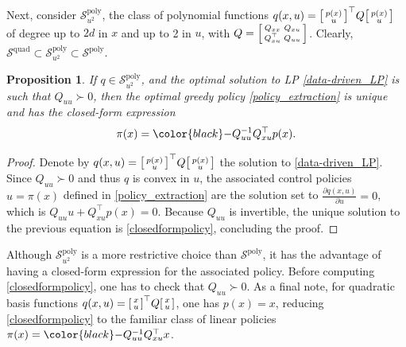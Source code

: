 \documentclass[journal,twoside,web]{ieeecolor}
\newtheorem{prop}{Proposition}
\newcommand{\Sc}{\mathcal{S}}
\newcommand{\review}{\color{black}}
\begin{document}
Next, consider $\Sc^{\text{poly}}_{u^2}$, the class of polynomial functions $q(x,u)=\begin{bsmallmatrix}
    p(x) \\ u 
\end{bsmallmatrix}^\top Q \begin{bsmallmatrix}
    p(x) \\ u 
\end{bsmallmatrix}$ of degree up to $2d$ in $x$ and up to 2 in $u$, with
$Q = \begin{bsmallmatrix} Q_{xx} & Q_{xu} \\ Q_{xu}^\top  & Q_{uu}
\end{bsmallmatrix}$. 
Clearly,  $\Sc^{\text{quad}}\subset\Sc^{\text{poly}}_{u^2}\subset\Sc^{\text{poly}}$.
%
\begin{prop}
    If $q\in\Sc^{\text{poly}}_{u^2}$, and the optimal solution to LP \eqref{data-driven_LP} is such that $Q_{uu}\succ0$, then the optimal greedy policy \eqref{policy_extraction} is unique and has the closed-form expression
    \begin{equation} \label{closedformpolicy}
        \pi(x)={\review -}Q_{uu}^{-1}Q_{xu}^\top p(x).
    \end{equation}
\end{prop}
\vspace{0.15cm}
\begin{proof}
 Denote by $q(x,u)=\begin{bsmallmatrix}
    p(x) \\ u 
\end{bsmallmatrix}^\top Q \begin{bsmallmatrix}
    p(x) \\ u 
\end{bsmallmatrix}$ the solution to \eqref{data-driven_LP}. 
Since $Q_{uu}\succ0$ and thus $q$ is convex in $u$, the associated control policies $u=\pi(x)$ defined in \eqref{policy_extraction} are the solution set to $\tfrac{\partial q(x,u)}{\partial u}=0$, which is $Q_{uu}u + Q_{xu}^\top p(x)=0$. Because $Q_{uu}$ is invertible, the unique solution to the previous equation is \eqref{closedformpolicy}, concluding the proof.
\end{proof}

Although $\Sc^{\text{poly}}_{u^2}$ is a more restrictive choice than  $\Sc^{\text{poly}}$, it has the advantage of having a closed-form expression for the associated policy. {\review Before computing \eqref{closedformpolicy}, one has to check that $Q_{uu}\succ0$.} As a final note, for quadratic basis functions $q(x,u)= \begin{bsmallmatrix}
    x \\ u
\end{bsmallmatrix}^\top Q \begin{bsmallmatrix}
    x \\ u
\end{bsmallmatrix}$, one has $p(x)=x$, reducing \eqref{closedformpolicy} to the familiar class of linear policies $\pi(x)={\review -}Q_{uu}^{-1} Q_{xu}^\top x$. 
\end{document}
